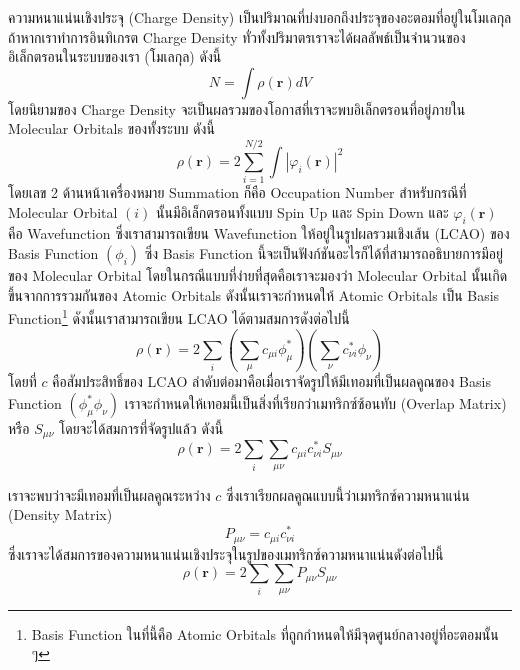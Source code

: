 ความหนาแน่นเชิงประจุ (Charge Density) เป็นปริมาณที่บ่งบอกถึงประจุของอะตอมที่อยู่ในโมเลกุล ถ้าหากเราทำการอินทิเกรต Charge Density ทั่วทั้งปริมาตรเราจะได้ผลลัพธ์เป็นจำนวนของอิเล็กตรอนในระบบของเรา (โมเลกุล) ดังนี้\autocite{szabo1996}
%
\begin{equation}
    N = \int \rho(\bm{r}) dV
\end{equation}
%
โดยนิยามของ Charge Density จะเป็นผลรวมของโอกาสที่เราจะพบอิเล็กตรอนที่อยู่ภายใน Molecular Orbitals ของทั้งระบบ ดังนี้
%
\begin{equation}\label{eq:charge_density}
    \rho(\bm{r}) = 2 \sum^{N/2}_{i=1} \int |\varphi_{i}(\bm{r})|^{2}
\end{equation}
%
\noindent โดยเลข 2 ด้านหน้าเครื่องหมาย Summation ก็คือ Occupation Number สำหรับกรณีที่ Molecular Orbital $(i)$ นั้นมีอิเล็กตรอนทั้งแบบ Spin Up และ Spin Down และ $\varphi_{i}(\bm{r})$ คือ Wavefunction ซึ่งเราสามารถเขียน Wavefunction ให้อยู่ในรูปผลรวมเชิงเส้น (LCAO) ของ Basis Function $(\phi_{i})$ ซึ่ง Basis Function นี้จะเป็นฟังก์ชันอะไรก็ได้ที่สามารถอธิบายการมีอยู่ของ Molecular Orbital โดยในกรณีแบบที่ง่ายที่สุดคือเราจะมองว่า Molecular Orbital นั้นเกิดขึ้นจากการรวมกันของ Atomic Orbitals ดังนั้นเราจะกำหนดให้ Atomic Orbitals เป็น Basis Function\footnote{Basis Function ในที่นี้คือ Atomic Orbitals ที่ถูกกำหนดให้มีจุดศูนย์กลางอยู่ที่อะตอมนั้น ๆ} ดังนั้นเราสามารถเขียน LCAO ได้ตามสมการดังต่อไปนี้ 
%
\begin{equation}
    \rho(\bm{r}) = 2 \sum_{i} \left ( \sum_{\mu} c_{\mu i} \phi_{\mu}^{*} \right )
    \left ( \sum_{\nu} c^{*}_{\nu i}  \phi_{\nu} \right )
\end{equation}
%
\noindent โดยที่ $c$ คือสัมประสิทธิ์ของ LCAO ลำดับต่อมาคือเมื่อเราจัดรูปให้มีเทอมที่เป็นผลคูณของ Basis Function $(\phi_{\mu}^{*} \phi_{\nu})$ เราจะกำหนดให้เทอมนี้เป็นสิ่งที่เรียกว่าเมทริกซ์ซ้อนทับ (Overlap Matrix) หรือ $S_{\mu\nu}$ โดยจะได้สมการที่จัดรูปแล้ว ดังนี้
%
\begin{equation}
    \rho(\bm{r}) = 2 \sum_{i}\sum_{\mu\nu} c_{\mu i} c^{*}_{\nu i} S_{\mu\nu}
\end{equation}

เราจะพบว่าจะมีเทอมที่เป็นผลคูณระหว่าง $c$ ซึ่งเราเรียกผลคูณแบบนี้ว่าเมทริกซ์ความหนาแน่น (Density Matrix) 
%
\begin{equation}\label{eq:density_matrix}
    P_{\mu\nu} = c_{\mu i} c^{*}_{\nu i}
\end{equation}
%
\noindent ซึ่งเราจะได้สมการของความหนาแน่นเชิงประจุในรูปของเมทริกซ์ความหนาแน่นดังต่อไปนี้
%
\begin{equation}\label{eq:charge_density_matrix}
    \rho(\bm{r}) = 2 \sum_{i} \sum_{\mu\nu} P_{\mu\nu}S_{\mu\nu}
\end{equation}

